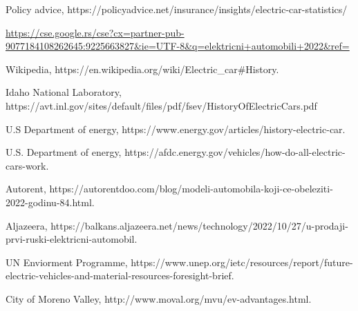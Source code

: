 \documentclass[a4paper]{article}
\begin{document}
\newpage
{}
\appendix

\begin{thebibliography}{10}

Policy advice, https://policyadvice.net/insurance/insights/electric-car-statistics/

 \url{https://cse.google.rs/cse?cx=partner-pub-9077184108262645:9225663827&ie=UTF-8&q=elektricni+automobili+2022&ref=}

Wikipedia,
https://en.wikipedia.org/wiki/Electric\_car#History.

Idaho National Laboratory,
https://avt.inl.gov/sites/default/files/pdf/fsev/HistoryOfElectricCars.pdf

U.S Department of energy,
https://www.energy.gov/articles/history-electric-car.

U.S. Department of energy,
https://afdc.energy.gov/vehicles/how-do-all-electric-cars-work.

Autorent,
https://autorentdoo.com/blog/modeli-automobila-koji-ce-obeleziti-2022-godinu-84.html.

Aljazeera,
https://balkans.aljazeera.net/news/technology/2022/10/27/u-prodaji-prvi-ruski-elektricni-automobil.

UN Enviorment Programme, https://www.unep.org/ietc/resources/report/future-electric-vehicles-and-material-resources-foresight-brief.

City of Moreno Valley,
http://www.moval.org/mvu/ev-advantages.html.

\end{thebibliography}
\end{document}

